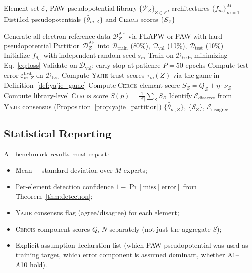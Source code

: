 \documentclass[11pt,a4paper]{article}
\theoremstyle{definition}
\newcommand{\Yajie}{\textsc{Yajie}}
\newcommand{\Cercis}{\textsc{Cercis}}
\begin{document}
\begin{algorithm}[htbp]
\caption{SCX-Audited Pseudopotential Distillation}
\label{alg:distillation}
\begin{algorithmic}[1]
\Require Element set $\mathcal{E}$, PAW pseudopotential library $\{\mathcal{P}_Z\}_{Z \in \mathcal{E}}$, architectures $\{f_m\}_{m=1}^M$
\Ensure Distilled pseudopotentials $\{\hat{\theta}_{m,Z}\}$ and \Cercis{} scores $\{S_Z\}$

    \State Generate all-electron reference data $\mathcal{D}_Z^{\mathrm{AE}}$ via FLAPW or PAW with hard pseudopotential
    \State Partition $\mathcal{D}_Z^{\mathrm{AE}}$ into $\mathcal{D}_{\mathrm{train}}$ (80\%), $\mathcal{D}_{\mathrm{val}}$ (10\%), $\mathcal{D}_{\mathrm{test}}$ (10\%)
        \State Initialize $f_{\theta_m}$ with independent random seed $s_m$
        \State Train on $\mathcal{D}_{\mathrm{train}}$ minimizing Eq.~\eqref{eq:loss}
        \State Validate on $\mathcal{D}_{\mathrm{val}}$; early stop at patience $P = 50$ epochs
        \State Compute test error $\varepsilon_{m,Z}^{\mathrm{test}}$ on $\mathcal{D}_{\mathrm{test}}$
    \EndFor
    \State Compute \Yajie{} trust scores $\tau_m(Z)$ via the game in Definition~\ref{def:yajie_game}
    \State Compute \Cercis{} element score $S_Z = Q_Z + \eta \cdot \nu_Z$
\EndFor
\State Compute library-level \Cercis{} score $S(p) = \frac{1}{|\mathcal{E}|}\sum_Z S_Z$
\State Identify $\mathcal{E}_{\mathrm{disagree}}$ from \Yajie{} consensus (Proposition~\ref{prop:yajie_partition})
\State \Return $\{\hat{\theta}_{m,Z}\}$, $\{S_Z\}$, $\mathcal{E}_{\mathrm{disagree}}$
\end{algorithmic}
\end{algorithm}

\subsection{Statistical Reporting}

All benchmark results must report:
\begin{itemize}
    \item Mean $\pm$ standard deviation over $M$ experts;
    \item Per-element detection confidence $1 - \Pr[\text{miss} \mid \text{error}]$ from Theorem~\ref{thm:detection};
    \item \Yajie{} consensus flag (agree/disagree) for each element;
    \item \Cercis{} component scores $Q$, $N$ separately (not just the aggregate $S$);
    \item Explicit assumption declaration list (which PAW pseudopotential was used as training target, which error component is assumed dominant, whether A1--A10 hold).
\end{itemize}
\end{document}
